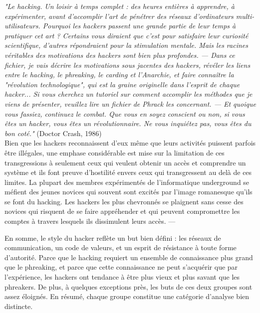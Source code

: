 \documentclass[11pt,twoside,a4paper]{book}
\begin{document}
	\emph{\footnotesize "Le hacking. Un loisir {\`a} temps complet : des heures enti{\`e}res {\`a} apprendre, {\`a} exp{\'e}rimenter, avant d'accomplir l'art de p{\'e}n{\'e}trer des r{\'e}seaux d'ordinateurs multi-utilisateurs. Pourquoi les hackers passent une grande partie de leur temps {\`a} pratiquer cet art ? Certains vous diraient que c'est pour satisfaire leur curiosit{\'e} scientifique, d'autres r{\'e}pondraient pour la stimulation mentale. Mais les racines v{\'e}ritables des motivations des hackers sont bien plus profondes. %
	--- Dans ce fichier, je vais d{\'e}crire les motivations sous jacentes des hackers, r{\'e}v{\'e}ler les liens entre le hacking, le phreaking, le carding et l'Anarchie, et faire conna{\^i}tre la "r{\'e}volution technologique", qui est la graine originelle dans l'esprit de chaque hacker... Si vous cherchez un tutoriel sur comment accomplir les m{\'e}thodes que je viens de pr{\'e}senter, veuillez lire un fichier de Phrack les concernant. %
	--- Et quoique vous fassiez, continuez le combat. Que vous en soyez conscient ou non, si vous {\^e}tes un hacker, vous {\^e}tes un r{\'e}volutionnaire. Ne vous inqui{\'e}tez pas, vous {\^e}tes du bon cot{\'e}."} (Doctor Crash, 1986) ~\\

Bien que les hackers reconnaissent d'eux m{\^e}me que leurs activit{\'e}s puissent parfois {\^e}tre ill{\'e}gales, une emphase consid{\'e}rable est mise sur la limitation de ces transgressions {\`a} seulement ceux qui veulent obtenir un acc{\`e}s et comprendre un syst{\`e}me et ils font preuve d'hostilit{\'e} envers ceux qui transgressent au del{\`a} de ces limites. La plupart des membres exp{\'e}riment{\'e}s de l'informatique underground se m{\'e}fient des jeunes novices qui souvent sont excit{\'e}s par l'image romanesque qu'ils se font du hacking. Les hackers les plus chevronn{\'e}s se plaignent sans cesse des novices qui risquent de se faire appr{\'e}hender et qui peuvent compromettre les comptes {\`a} travers lesquels ils dissimulent leurs acc{\`e}s. --- %

En somme, le style du hacker refl{\`e}te un but bien d{\'e}fini : les r{\'e}seaux de communication, un code de valeurs, et un esprit de r{\'e}sistance {\`a} toute forme d'autorit{\'e}. Parce que le hacking requiert un ensemble de connaissance plus grand que le phreaking, et parce que cette connaissance ne peut s'acqu{\'e}rir que par l'exp{\'e}rience, les hackers ont tendance {\`a} {\^e}tre plus vieux et plus savant que les phreakers. De plus, {\`a} quelques exceptions pr{\`e}s, les buts de ces deux groupes sont assez {\'e}loign{\'e}s. En r{\'e}sum{\'e}, chaque groupe constitue une cat{\'e}gorie d'analyse bien distincte. ~\\
\end{document}

